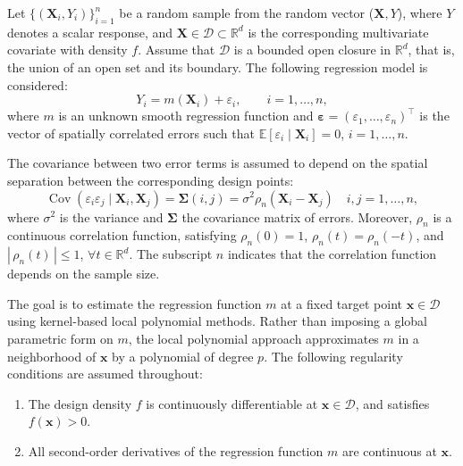 \documentclass[12pt]{report} %
\newcommand{\bX}{\mathbf{X}}
\newcommand{\bx}{\mathbf{x}}
\newcommand{\bSigma}{\boldsymbol\Sigma}
\newcommand{\lc}{\left[}
\newcommand{\rc}{\right]}
\newcommand{\V}[1]{\mathbb{V}\mathrm{ar}\lc #1\rc}
\begin{document}
Let $\{(\bX_i, Y_i)\}_{i=1}^n$ be a random sample from the random vector ($\bX, Y$), where $Y$ denotes a scalar response, and $\bX \in \mathcal{D} \subset \mathbb{R}^d$ is the corresponding multivariate covariate with density $f$. Assume that $\mathcal{D}$ is a bounded open closure in $\mathbb{R}^d$, that is, the union of an open set and its boundary. The following regression model is considered: 
\begin{equation}
    \label{eq:model-Eucl-spat}
    Y_i = m(\bX_i) + \varepsilon_i, \qquad i = 1,\dots,n,
\end{equation}
where $m$ is an unknown smooth regression function and $\boldsymbol{\varepsilon} = (\varepsilon_1,\ldots,\varepsilon_n)^\top$ is the vector of spatially correlated errors such that $\mathbb{E}[\varepsilon_i \mid \bX_i] = 0$, $i = 1,\ldots,n.$

The covariance between two error terms is assumed to depend on the spatial separation between the corresponding design points:
\begin{equation}
    \label{eq:corr-Euclidean}
    \operatorname{Cov}\left(\varepsilon_i\varepsilon_j\mid \bX_i,\bX_j\right) = \bSigma(i,j) = \sigma^2 \rho_n(\bX_i-\bX_j) \quad i,j = 1, \ldots, n,
\end{equation}
where $\sigma^2$ is the variance and $\bSigma$ the covariance matrix of errors. Moreover, $\rho_n$ is a continuous correlation function, satisfying $\rho_n(0)=1$, $\rho_n(t)=\rho_n(-t)$, and $\left| \,\rho_n(t) \,\right| \leq 1$, $\forall t  \in \mathbb{R}^d$. The subscript $n$ indicates that the correlation function depends on the sample size.  


The goal is to estimate the regression function $m$ at a fixed target point $\bx\in\mathcal{D}$ using kernel-based local polynomial methods. Rather than imposing a global parametric form on $m$, the local polynomial approach approximates $m$ in a neighborhood of $\bx$ by a polynomial of degree $p$. The following regularity conditions are assumed throughout:
\begin{enumerate}[label=(\textbf{B\arabic{*}}), 
ref=\textbf{(B\arabic*)}]
    \item \label{B1} The design density $f$ is continuously 
    differentiable at $\bx\in\mathcal{D}$, and satisfies 
    $f(\bx)>0$.
    \item \label{B2} All second-order derivatives of the 
    regression function $m$ are continuous at $\bx$.
\end{enumerate}
\end{document}
